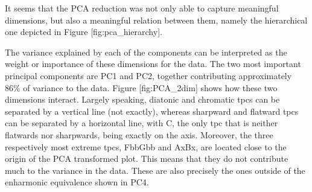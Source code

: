 \documentclass[letterpaper,10pt,english]{sphinxmanual}
\begin{document}
\sphinxAtStartPar
It seems that the PCA reduction was not only able to capture meaningful
dimensions, but also a meaningful relation between them, namely the
hierarchical one depicted in Figure {[}fig:pca\_hierarchy{]}.

\sphinxAtStartPar
The variance explained by each of the components can be interpreted as
the weight or importance of these dimensions for the data. The two most
important principal components are PC1 and PC2, together contributing
approximately 86\% of variance to the data. Figure {[}fig:PCA\_2dim{]} shows
how these two dimensions interact. Largely speaking, diatonic and
chromatic tpcs can be separated by a vertical line (not exactly),
whereas sharpward and flatward tpcs can be separated by a horizontal
line, with C, the only tpc that is neither flatwards nor sharpwards,
being exactly on the axis. Moreover, the three respectively most extreme
tpcs, Fbb\textendash{}Gbb and Ax\textendash{}Bx, are located close to the origin of the PCA
transformed plot. This means that they do not contribute much to the
variance in the data. These are also precisely the ones outside of the
enharmonic equivalence shown in PC4.
\end{document}
